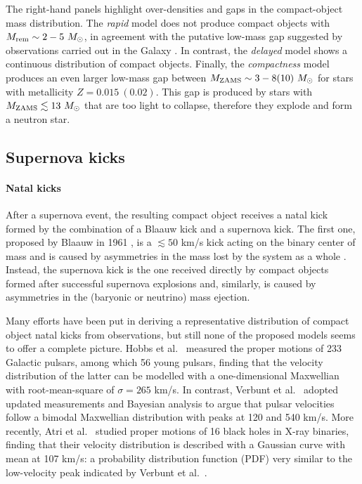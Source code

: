 \documentclass[a4paper,titlepage]{book}     	%
\newcommand{\sun}{\ensuremath{_\odot}}
\newcommand{\mzams}{M_\textup{ZAMS}}
\newcommand{\msun}{\ensuremath{M\sun}}
\begin{document}
The right-hand panels highlight over-densities and gaps in the compact-object mass distribution. The \emph{rapid} model does not produce compact objects with $M_{\rm rem} \sim 2-5~\msun$, in agreement with the putative low-mass gap suggested by observations carried out in the Galaxy \cite{massgapreal_ozel2010}. In contrast, the \emph{delayed} model shows a continuous distribution of compact objects. Finally, the \emph{compactness} model produces an even larger low-mass gap between $\mzams \sim 3-8(10)~\msun $ for stars with metallicity $Z=0.015~(0.02)$. This gap is produced by stars with $\mzams \lesssim 13~\msun$ that are too light to collapse, therefore they explode and form a neutron star.





\subsection{Supernova kicks}\label{subsec:kicksSEVN}
\paragraph{Natal kicks} After a supernova event, the resulting compact object receives a natal kick formed by the combination of a Blaauw kick and a supernova kick. The first one, proposed by Blaauw in 1961 \cite{Blaauw1961}, is a $\lesssim 50$ km/s kick acting on the binary center of mass and is caused by asymmetries in the mass lost by the system as a whole \cite{Mandel2016_kicks}. Instead, the supernova kick is the one received directly by compact objects formed after successful supernova explosions and, similarly, is caused by asymmetries in the (baryonic or neutrino) mass ejection. 


Many efforts have been put in deriving a representative distribution of compact object natal kicks from observations, but still none of the proposed models seems to offer a complete picture. Hobbs et al.\ \cite{Hobbs2005} measured the proper motions of 233 Galactic pulsars, among which 56 young pulsars, finding that the velocity distribution of the latter can be modelled with a one-dimensional Maxwellian with root-mean-square of $\sigma = 265$ km/s. In contrast, Verbunt et al.\ \cite{Verbunt2017_bimodalkicks} adopted updated measurements and Bayesian analysis to argue that pulsar velocities follow a bimodal Maxwellian distribution with peaks at 120 and 540 km/s. More recently, Atri et al.\ \cite{Atri2019_kicks} studied proper motions of 16 black holes in X-ray binaries, finding that their velocity distribution is described with a Gaussian  curve with mean at 107 km/s: a probability distribution function (PDF)  very similar to the low-velocity peak indicated by Verbunt et al.\ \cite{Verbunt2017_bimodalkicks}.\\
\end{document}
